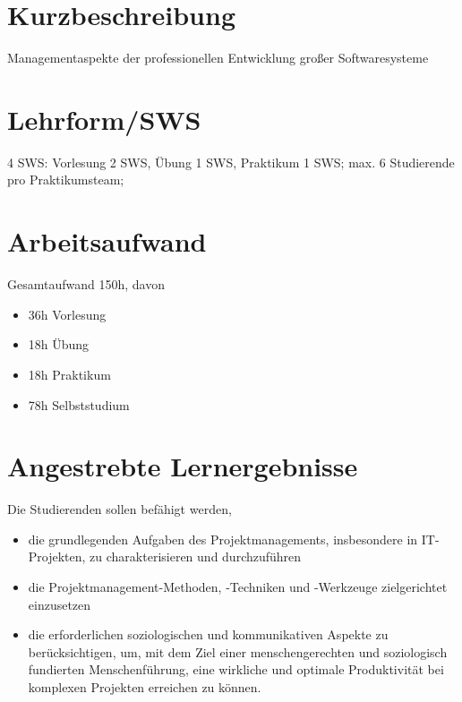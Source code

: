 \section*{Kurzbeschreibung\label{/mi-2017/modulbeschreibungen-bachelor/BA_Projektmanagement}}\label{kurzbeschreibungpathlabelmi-2017modulbeschreibungen-bachelorbaux5fprojektmanagement}

Managementaspekte der professionellen Entwicklung großer Softwaresysteme

\section*{Lehrform/SWS\label{/mi-2017/modulbeschreibungen-bachelor/BA_Projektmanagement}}\label{lehrformswspathlabelmi-2017modulbeschreibungen-bachelorbaux5fprojektmanagement}

4 SWS: Vorlesung 2 SWS, Übung 1 SWS, Praktikum 1 SWS; max. 6 Studierende
pro Praktikumsteam;

\section*{Arbeitsaufwand\label{/mi-2017/modulbeschreibungen-bachelor/BA_Projektmanagement}}\label{arbeitsaufwandpathlabelmi-2017modulbeschreibungen-bachelorbaux5fprojektmanagement}

Gesamtaufwand 150h, davon

\begin{itemize}
\tightlist
\item
  36h Vorlesung
\item
  18h Übung
\item
  18h Praktikum
\item
  78h Selbststudium
\end{itemize}

\section*{Angestrebte
Lernergebnisse\label{/mi-2017/modulbeschreibungen-bachelor/BA_Projektmanagement}}\label{angestrebte-lernergebnissepathlabelmi-2017modulbeschreibungen-bachelorbaux5fprojektmanagement}

Die Studierenden sollen befähigt werden,

\begin{itemize}
\tightlist
\item
  die grundlegenden Aufgaben des Projektmanagements, insbesondere in
  IT-Projekten, zu charakterisieren und durchzuführen
\item
  die Projektmanagement-Methoden, -Techniken und -Werkzeuge
  zielgerichtet einzusetzen
\item
  die erforderlichen soziologischen und kommunikativen Aspekte zu
  berücksichtigen, um, mit dem Ziel einer menschengerechten und
  soziologisch fundierten Menschenführung, eine wirkliche und optimale
  Produktivität bei komplexen Projekten erreichen zu können.
\end{itemize}


